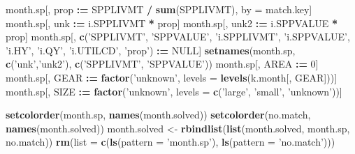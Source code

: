 \documentclass[]{article}
\newenvironment{Shaded}{\begin{snugshade}}{\end{snugshade}}
\newcommand{\KeywordTok}[1]{\textcolor[rgb]{0.13,0.29,0.53}{\textbf{#1}}}
\newcommand{\DataTypeTok}[1]{\textcolor[rgb]{0.13,0.29,0.53}{#1}}
\newcommand{\DecValTok}[1]{\textcolor[rgb]{0.00,0.00,0.81}{#1}}
\newcommand{\StringTok}[1]{\textcolor[rgb]{0.31,0.60,0.02}{#1}}
\newcommand{\OtherTok}[1]{\textcolor[rgb]{0.56,0.35,0.01}{#1}}
\newcommand{\OperatorTok}[1]{\textcolor[rgb]{0.81,0.36,0.00}{\textbf{#1}}}
\newcommand{\ErrorTok}[1]{\textcolor[rgb]{0.64,0.00,0.00}{\textbf{#1}}}
\newcommand{\NormalTok}[1]{#1}
\begin{document}
\begin{Shaded}
\begin{Highlighting}[]
\NormalTok{  month.sp[, prop }\OperatorTok{:}\ErrorTok{=}\StringTok{ }\NormalTok{SPPLIVMT }\OperatorTok{/}\StringTok{ }\KeywordTok{sum}\NormalTok{(SPPLIVMT), by =}\StringTok{ }\NormalTok{match.key]}
\NormalTok{  month.sp[, unk  }\OperatorTok{:}\ErrorTok{=}\StringTok{ }\NormalTok{i.SPPLIVMT }\OperatorTok{*}\StringTok{ }\NormalTok{prop]}
\NormalTok{  month.sp[, unk2 }\OperatorTok{:}\ErrorTok{=}\StringTok{ }\NormalTok{i.SPPVALUE }\OperatorTok{*}\StringTok{ }\NormalTok{prop]}
\NormalTok{  month.sp[, }\KeywordTok{c}\NormalTok{(}\StringTok{'SPPLIVMT'}\NormalTok{, }\StringTok{'SPPVALUE'}\NormalTok{, }\StringTok{'i.SPPLIVMT'}\NormalTok{, }\StringTok{'i.SPPVALUE'}\NormalTok{, }\StringTok{'i.HY'}\NormalTok{, }\StringTok{'i.QY'}\NormalTok{, }
               \StringTok{'i.UTILCD'}\NormalTok{, }\StringTok{'prop'}\NormalTok{) }\OperatorTok{:}\ErrorTok{=}\StringTok{ }\OtherTok{NULL}\NormalTok{]}
  \KeywordTok{setnames}\NormalTok{(month.sp, }\KeywordTok{c}\NormalTok{(}\StringTok{'unk'}\NormalTok{,}\StringTok{'unk2'}\NormalTok{), }\KeywordTok{c}\NormalTok{(}\StringTok{'SPPLIVMT'}\NormalTok{, }\StringTok{'SPPVALUE'}\NormalTok{))}
\NormalTok{  month.sp[, AREA }\OperatorTok{:}\ErrorTok{=}\StringTok{ }\DecValTok{0}\NormalTok{]}
\NormalTok{  month.sp[, GEAR }\OperatorTok{:}\ErrorTok{=}\StringTok{ }\KeywordTok{factor}\NormalTok{(}\StringTok{'unknown'}\NormalTok{, }\DataTypeTok{levels =} \KeywordTok{levels}\NormalTok{(k.month[, GEAR]))]}
\NormalTok{  month.sp[, SIZE }\OperatorTok{:}\ErrorTok{=}\StringTok{ }\KeywordTok{factor}\NormalTok{(}\StringTok{'unknown'}\NormalTok{, }\DataTypeTok{levels =} \KeywordTok{c}\NormalTok{(}\StringTok{'large'}\NormalTok{, }\StringTok{'small'}\NormalTok{, }\StringTok{'unknown'}\NormalTok{))]}
  
  \KeywordTok{setcolorder}\NormalTok{(month.sp,  }\KeywordTok{names}\NormalTok{(month.solved))}
  \KeywordTok{setcolorder}\NormalTok{(no.match, }\KeywordTok{names}\NormalTok{(month.solved))}
\NormalTok{  month.solved <-}\StringTok{ }\KeywordTok{rbindlist}\NormalTok{(}\KeywordTok{list}\NormalTok{(month.solved, month.sp, no.match))}
  \KeywordTok{rm}\NormalTok{(}\DataTypeTok{list =} \KeywordTok{c}\NormalTok{(}\KeywordTok{ls}\NormalTok{(}\DataTypeTok{pattern =} \StringTok{'month.sp'}\NormalTok{), }\KeywordTok{ls}\NormalTok{(}\DataTypeTok{pattern =} \StringTok{'no.match'}\NormalTok{)))}
  

\end{Highlighting}
\end{Shaded}
\end{document}
